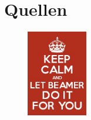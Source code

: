\documentclass[12pt, aspectratio=169]{beamer}
\begin{document}
\section{Quellen}
\begin{frame}[allowframebreaks]
    \nocite{*}
	\hfill
	\begin{figure}
		\includegraphics[keepaspectratio=true, width=100px]{./image/J3Nae.png}
	\end{figure}
    
    
\end{frame}
\end{document}
